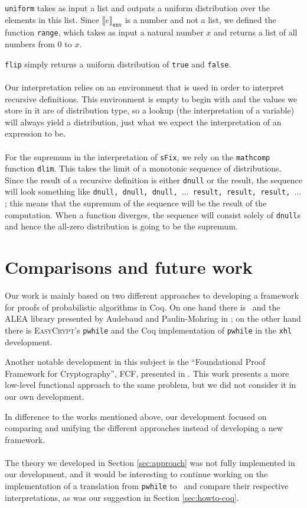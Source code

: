 \documentclass[11pt, leqno, titlepage]{article}
\def\coqe{\lstinline[language=Coq, basicstyle=\small]}
\theoremstyle{definition}
\begin{document}
\texttt{uniform} takes as input a list and outputs a uniform distribution over the
elements in this list. Since $\llbracket e\rrbracket_{\texttt{env}}$ is a number and
not a list, we defined the function \texttt{range}, which takes as input a natural
number $x$ and returns a list of all numbers from 0 to $x$.

\texttt{flip} simply returns a uniform distribution of \texttt{true} and
\texttt{false}. \\
\\
Our interpretation relies on an environment that is used in order to interpret
recursive definitions. This environment is empty to begin with and the values we
store in it are of distribution type, so a lookup (the interpretation of a variable)
will always yield a distribution, just what we expect the interpretation of an
expression to be. \\
\\
For the supremum in the interpretation of \coqe{sFix}, we rely on the
\texttt{mathcomp} function \texttt{dlim}. This takes the limit of a monotonic
sequence of distributions. Since the result of a recursive definition is either
\texttt{dnull} or the result, the sequence will look something like \texttt{dnull,
  dnull, dnull, $\dots$ result, result, result, $\dots$}; this means that the
supremum of the sequence will be the result of the computation. When a function
diverges, the sequence will consist solely of \texttt{dnull}s  and hence the all-zero
distribution is going to be the supremum. 

\section{Comparisons and future work}
\label{sec:future}
Our work is mainly based on two different approaches to developing a framework for
proofs of probabilistic algorithms in Coq. On one hand there is \rml\ and the ALEA
library presented by Audebaud and Paulin-Mohring in \cite{rml-paper}; on the other
hand there is \textsc{EasyCrypt}'s \texttt{pwhile} and the Coq implementation of
\texttt{pwhile} in the \texttt{xhl} development.

Another notable development in this subject is the ``Foundational Proof Framework for
Cryptography'', FCF, presented in \cite{fcf}. This work presents a more low-level
functional approach to the same problem, but we did not consider it in our own
development. 

In difference to the works mentioned above, our development focused on comparing and
unifying the different approaches instead of developing a new framework.\\
\\
The theory we developed in Section \ref{sec:approach} was not fully implemented in
our development, and it would be interesting to continue working on the
implementation of a translation from \texttt{pwhile} to \rml\ and compare their
respective interpretations, as was our suggestion in Section \ref{sec:howto-coq}.
\end{document}
